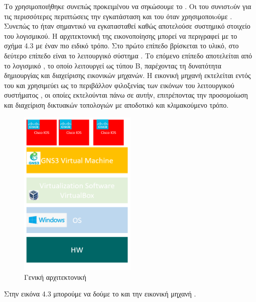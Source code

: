 Το  χρησιμοποιήθηκε συνεπώς προκειμένου να σηκώσουμε το . Οι  του  συνιστoύν για τις περισσότερες περιπτώσεις την εγκατάσταση και του  όταν χρησιμοποιoύμε . Συνεπώς το  ήταν σημαντικό να εγκατασταθεί καθώς αποτελούσε συστημικό στοιχείο του  λογισμικού. Η αρχιτεκτονική της εικονοποίησης μπορεί να περιγραφεί με το σχήμα 4.3 με έναν πιο ειδικό τρόπο. Στο πρώτο επίπεδο βρίσκεται το υλικό, στο δεύτερο επίπεδο είναι το λειτουργικό σύστημα . Το επόμενο επίπεδο αποτελείται από το λογισμικό , το οποίο λειτουργεί ως  τύπου Β, παρέχοντας τη δυνατότητα δημιουργίας και διαχείρισης εικονικών μηχανών. Η εικονική μηχανή  εκτελείται εντός του  και χρησιμεύει ως το περιβάλλον φιλοξενίας των εικόνων του λειτουργικού συστήματος , οι οποίες εκτελούνται πάνω σε αυτήν, επιτρέποντας την προσομοίωση και διαχείριση δικτυακών τοπολογιών με αποδοτικό και κλιμακούμενο τρόπο.



\begin{figure}[htb]
	\centering
	\includegraphics[width=0.5\textwidth]{graphics/virtualization_architecture.PNG}
	\caption{ Γενική αρχιτεκτονική}
\end{figure}

Στην εικόνα 4.3 μπορούμε να δούμε το  και την εικονική μηχανή .

